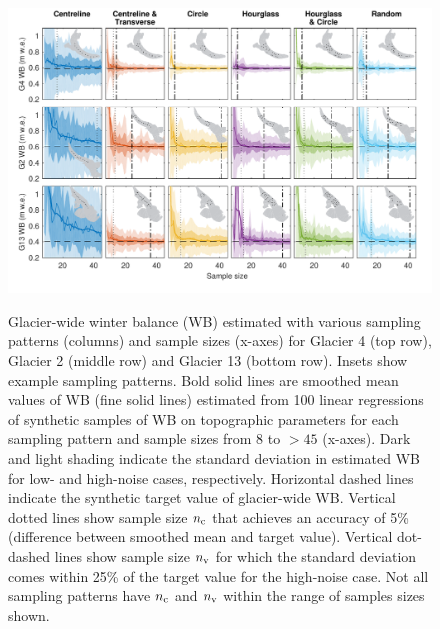 \documentclass[twocolumn,letterpaper]{igs}
\begin{document}
\begin{figure}
	\centering
	\includegraphics[width =\textwidth]{Pulwicki_Fig3.pdf}\\
	\caption{Glacier-wide winter balance (WB) estimated with various sampling patterns (columns) and sample sizes (x-axes) for Glacier 4 (top row), Glacier 2 (middle row) and Glacier 13 (bottom row). Insets show example sampling patterns. Bold solid lines are smoothed mean values of WB  (fine solid lines) estimated from 100 linear regressions of synthetic samples of WB on topographic parameters for each sampling pattern and sample sizes from 8 to $> 45$ (x-axes). Dark and light shading indicate the standard deviation in estimated WB for low- and high-noise cases, respectively. Horizontal dashed lines indicate the synthetic target value of glacier-wide WB. Vertical dotted lines show sample size $n_{\rm c}$ that achieves an accuracy of 5\% (difference between smoothed mean and target value). Vertical dot-dashed lines show sample size $n_{\rm v}$ for which the standard deviation comes within 25\% of the target value for the high-noise case. Not all sampling patterns have $n_{\rm c}$ and $n_{\rm v}$ within the range of samples sizes shown.}
	\label{fig:SyntheticObsWB}
\end{figure}
\end{document}
